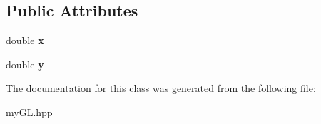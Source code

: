 \subsection*{Public Attributes}
\begin{DoxyCompactItemize}
\item 
double {\bfseries x}\hypertarget{classCursorMovement_ac77861debf3dc2013b7ee0f6775b6540}{}\label{classCursorMovement_ac77861debf3dc2013b7ee0f6775b6540}

\item 
double {\bfseries y}\hypertarget{classCursorMovement_afab93e8fcc9f845fdcf6fffdf9232cab}{}\label{classCursorMovement_afab93e8fcc9f845fdcf6fffdf9232cab}

\end{DoxyCompactItemize}


The documentation for this class was generated from the following file\+:\begin{DoxyCompactItemize}
\item 
my\+G\+L.\+hpp\end{DoxyCompactItemize}
